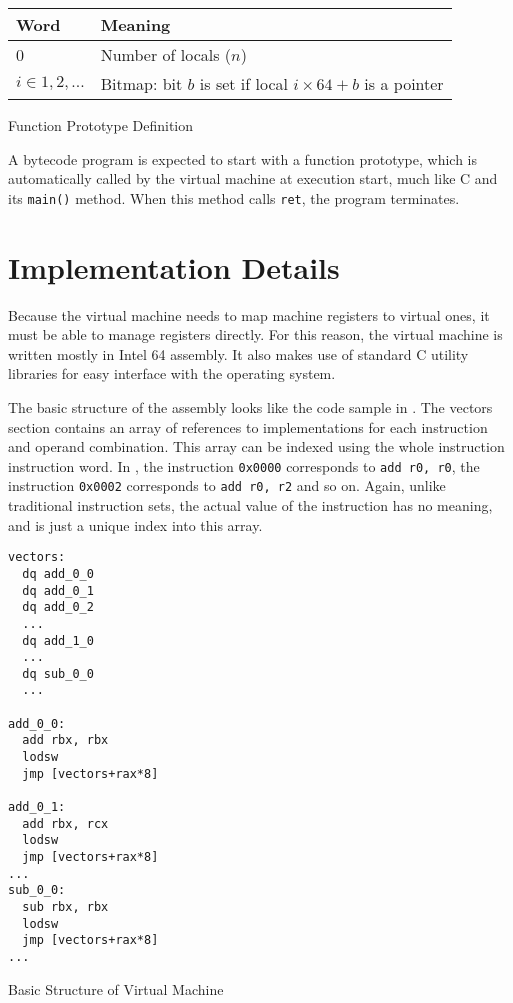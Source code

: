 		\begin{myfigure}
			\begin{tabular}{|l|l| }
				\hline
				Word & Meaning \\
				\hline
				0 & Number of locals ($n$) \\
				\hline
				$i \in 1, 2, ...$ & Bitmap: bit $b$ is set if local $i\times64 + b$ is a pointer \\
				\hline
			\end{tabular}
			\caption{Function Prototype Definition}
			\label{fig:funcproto}
		\end{myfigure}
		
	
		
		A bytecode program is expected to start with a function prototype, which is automatically called by the virtual machine at execution start, much like C and its \texttt{main()} method. When this method calls \texttt{ret}, the program terminates.
		
	\section{Implementation Details}
		Because the virtual machine needs to map machine registers to virtual ones, it must be able to manage registers directly. For this reason, the virtual machine is written mostly in Intel 64 assembly. It also makes use of standard C utility libraries for easy interface with the operating system.
		
		The basic structure of the assembly looks like the code sample in . The vectors section contains an array of references to implementations for each instruction and operand combination. This array can be indexed using the whole instruction instruction word. In , the instruction \texttt{0x0000} corresponds to \texttt{add r0, r0}, the instruction \texttt{0x0002} corresponds to \texttt{add r0, r2} and so on. Again, unlike traditional instruction sets, the actual value of the instruction has no meaning, and is just a unique index into this array.
		
		\begin{myfigure}
			\begin{lstlisting}
vectors:
  dq add_0_0
  dq add_0_1
  dq add_0_2
  ...
  dq add_1_0
  ...
  dq sub_0_0
  ...

add_0_0:
  add rbx, rbx
  lodsw
  jmp [vectors+rax*8]

add_0_1:
  add rbx, rcx
  lodsw
  jmp [vectors+rax*8]
...
sub_0_0:
  sub rbx, rbx
  lodsw
  jmp [vectors+rax*8]
...
			\end{lstlisting}
			\caption{Basic Structure of Virtual Machine}
			\label{fig:vmstructure}
		\end{myfigure}
		
